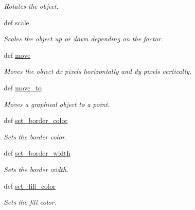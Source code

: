 \begin{DoxyCompactItemize}
\begin{DoxyCompactList}\small\item\em Rotates the object. \item\end{DoxyCompactList}\item 
def \hyperlink{classcs110graphics_1_1Fillable_a80d5b6b6d2ebae867dccecb803075749}{scale}
\begin{DoxyCompactList}\small\item\em Scales the object up or down depending on the factor. \item\end{DoxyCompactList}\item 
def \hyperlink{classcs110graphics_1_1Fillable_ae8f6c476e29c0810453dc16948e1730c}{move}
\begin{DoxyCompactList}\small\item\em Moves the object dx pixels horizontally and dy pixels vertically. \item\end{DoxyCompactList}\item 
def \hyperlink{classcs110graphics_1_1Fillable_adcabc14e76d1160ff591b9ef7f3d6a97}{move\_\-to}
\begin{DoxyCompactList}\small\item\em Moves a graphical object to a point. \item\end{DoxyCompactList}\item 
def \hyperlink{classcs110graphics_1_1Fillable_a2f830be5d970faac97759910d20d68a4}{set\_\-border\_\-color}
\begin{DoxyCompactList}\small\item\em Sets the border color. \item\end{DoxyCompactList}\item 
def \hyperlink{classcs110graphics_1_1Fillable_a09f05462cb2ed38fdccb244340f05b2b}{set\_\-border\_\-width}
\begin{DoxyCompactList}\small\item\em Sets the border width. \item\end{DoxyCompactList}\item 
def \hyperlink{classcs110graphics_1_1Fillable_a4f24c7186c8d057e42a0209eb1d56be7}{set\_\-fill\_\-color}
\begin{DoxyCompactList}\small\item\em Sets the fill color. \item\end{DoxyCompactList}\item 

\end{DoxyCompactItemize}
